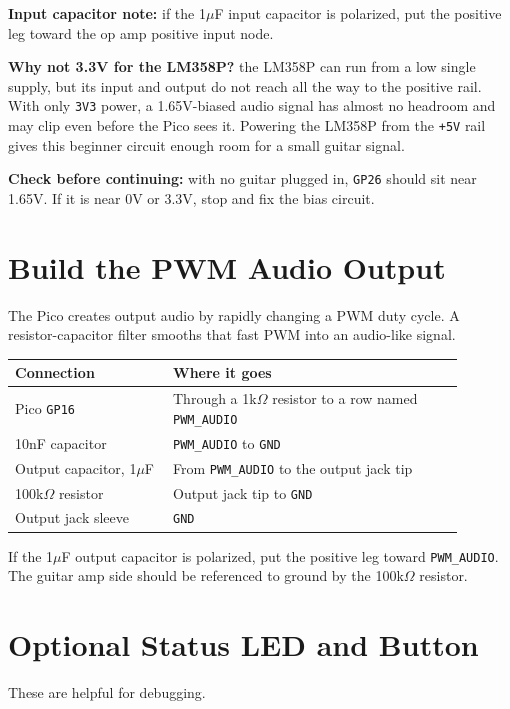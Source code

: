 \documentclass[11pt,letterpaper]{article}
\newcommand{\pin}[1]{\texttt{#1}}
\begin{document}
\textbf{Input capacitor note:} if the 1$\mu$F input capacitor is polarized, put the positive leg toward the op amp positive input node.

\textbf{Why not 3.3V for the LM358P?} the LM358P can run from a low single supply, but its input and output do not reach all the way to the positive rail. With only \texttt{3V3} power, a 1.65V-biased audio signal has almost no headroom and may clip even before the Pico sees it. Powering the LM358P from the \texttt{+5V} rail gives this beginner circuit enough room for a small guitar signal.

\textbf{Check before continuing:} with no guitar plugged in, \pin{GP26} should sit near 1.65V. If it is near 0V or 3.3V, stop and fix the bias circuit.

\section*{Build the PWM Audio Output}
The Pico creates output audio by rapidly changing a PWM duty cycle. A resistor-capacitor filter smooths that fast PWM into an audio-like signal.

\begin{center}
\begin{tabular}{>{\raggedright\arraybackslash}p{0.31\linewidth} >{\raggedright\arraybackslash}p{0.58\linewidth}}
\toprule
Connection & Where it goes \\
\midrule
Pico \pin{GP16} & Through a 1k$\Omega$ resistor to a row named \texttt{PWM\_AUDIO} \\
10nF capacitor & \texttt{PWM\_AUDIO} to \texttt{GND} \\
Output capacitor, 1$\mu$F & From \texttt{PWM\_AUDIO} to the output jack tip \\
100k$\Omega$ resistor & Output jack tip to \texttt{GND} \\
Output jack sleeve & \texttt{GND} \\
\bottomrule
\end{tabular}
\end{center}

If the 1$\mu$F output capacitor is polarized, put the positive leg toward \texttt{PWM\_AUDIO}. The guitar amp side should be referenced to ground by the 100k$\Omega$ resistor.

\section*{Optional Status LED and Button}
These are helpful for debugging.
\end{document}
